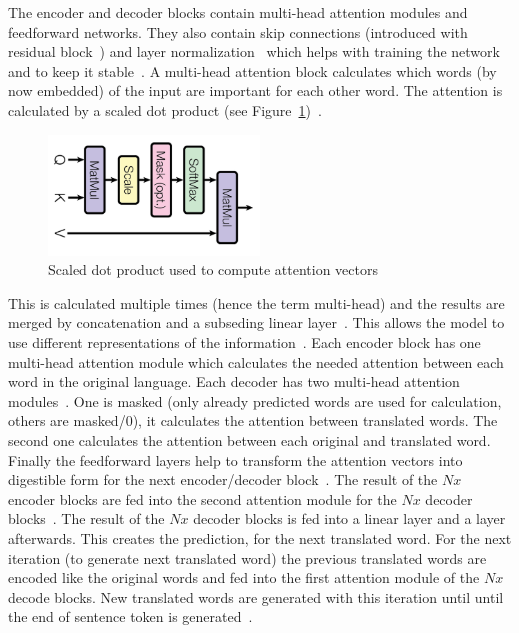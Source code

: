 The encoder and decoder blocks contain multi-head attention modules and feedforward networks.
They also contain skip connections (introduced with residual block~\citep{he_deep_2015}) and layer
normalization~\citep{vaswani_attention_2017} which helps with training the network and to keep it
stable~\citep{liu_rethinking_2021}.
A multi-head attention block calculates which words (by now embedded) of the input are
important for each other word.
The attention is calculated by a scaled dot product (see
Figure~\ref{fig:transformer-dot-product})~\citep{vaswani_attention_2017}.
\begin{figure}[ht]
    \centering
    \includegraphics[width=0.5\textwidth]{img/Transformer-Scaled-Dot-Product-Vasani-Attention-2017.png}
    \caption[Computation of an attention mechanism]{%
        Scaled dot product used to compute attention
        vectors~\citep{vaswani_attention_2017}\label{fig:transformer-dot-product}
    }
\end{figure}
This is calculated multiple times (hence the term multi-head) and the results are merged by
concatenation and a subseding linear layer~\citep{vaswani_attention_2017}.
This allows the model to use different representations of the
information~\citep{vaswani_attention_2017}.
Each encoder block has one multi-head attention module which calculates the needed attention
between each word in the original language.
Each decoder has two multi-head attention modules~\citep{vaswani_attention_2017}.
One is masked (only already predicted words are used for calculation, others are masked/0), it
calculates the attention between translated words.
The second one calculates the attention between each original and translated word.
Finally the feedforward layers help to transform the attention vectors into digestible form for the
next encoder/decoder block~\citep{vaswani_attention_2017}.
The result of the $Nx$ encoder blocks are fed into the second attention module for the $Nx$ decoder
blocks~\citep{vaswani_attention_2017}.
The result of the $Nx$ decoder blocks is fed into a linear layer and a \sfmx layer afterwards.
This creates the prediction, for the next translated word.
For the next iteration (to generate next translated word) the previous translated words are encoded
like the original words and fed into the first attention module of the $Nx$ decode blocks.
New translated words are generated with this iteration until until the end of sentence token
is generated~\citep{vaswani_attention_2017}.
